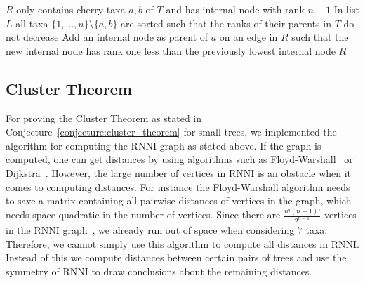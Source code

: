 \documentclass{amsart}
\newcommand{\rnni}{\mathrm{RNNI}}
\newcommand{\mdtree}{\textsc{MDTree}}
\begin{document}
\begin{algorithm}[H]
\caption{$\mdtree(T)$}
\label{alg:max_dist_tree}
\begin{algorithmic}[1]
	\STATE $R$ only contains cherry taxa $a, b$ of $T$ and has internal node with rank $n-1$
    \STATE In list $L$ all taxa $\{1,\ldots,n\}\setminus\{a,b\}$ are sorted such that the ranks of their parents in $T$ do not decrease
		\STATE Add an internal node as parent of $a$ on an edge in $R$ such that the new internal node has rank one less than the previously lowest internal node
	\ENDFOR
	\RETURN $R$
\end{algorithmic}
\end{algorithm}

\subsection{Cluster Theorem}
\label{section:computation_cluster_theorem}


For proving the Cluster Theorem as stated in Conjecture~\ref{conjecture:cluster_theorem} for small trees, we implemented the algorithm for computing the $\rnni$ graph as stated above.
If the graph is computed, one can get distances by using algorithms such as Floyd-Warshall~\autocite{Floyd1962-ew} or Dijkstra~\autocite{Dijkstra1959-ph}.
However, the large number of vertices in $\rnni$ is an obstacle when it comes to computing distances.
For instance the Floyd-Warshall algorithm needs to save a matrix containing all pairwise distances of vertices in the graph, which needs space quadratic in the number of vertices.
Since there are $\frac{n!(n-1)!}{2^{n-1}}$ vertices in the $\rnni$ graph~\autocite{Gavryushkin2018-ol}, we already run out of space when considering $7$ taxa.
Therefore, we cannot simply use this algorithm to compute all distances in $\rnni$.
Instead of this we compute distances between certain pairs of trees and use the symmetry of $\rnni$ to draw conclusions about the remaining distances.
\end{document}

